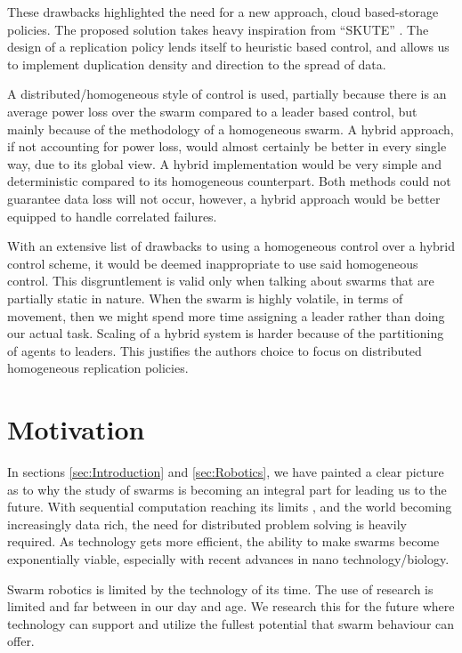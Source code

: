 \documentclass{UoYCSproject}
\begin{document}
These drawbacks highlighted the need for a new approach, cloud based-storage policies. The proposed solution takes heavy inspiration from “SKUTE” \cite{Distributed Storage}. The design of a replication policy lends itself to heuristic based control, and allows us to implement duplication density and direction to the spread of data.

A distributed/homogeneous style of control is used, partially because there is an average power loss over the swarm compared to a leader based control, but mainly because of the methodology of a homogeneous swarm. A hybrid approach, if not accounting for power loss, would almost certainly be better in every single way, due to its global view. A hybrid implementation would be very simple and deterministic compared to its homogeneous counterpart. Both methods could not guarantee data loss will not occur, however, a hybrid approach would be better equipped to handle correlated failures.

With an extensive list of drawbacks to using a homogeneous control over a hybrid control scheme, it would be deemed inappropriate to use said homogeneous control. This disgruntlement is valid only when talking about swarms that are partially static in nature. When the swarm is highly volatile, in terms of movement, then we might spend more time assigning a leader rather than doing our actual task. Scaling of a hybrid system is harder because of the partitioning of agents to leaders. This justifies the authors choice to focus on distributed homogeneous replication policies.

\section{Motivation}
\label{sec:Motivation}

In sections \ref{sec:Introduction} and \ref{sec:Robotics}, we have painted a clear picture as to why the study of swarms is becoming an integral part for leading us to the future.
With sequential computation reaching its limits \cite{CPU speed}, and the world becoming increasingly data rich, the need for distributed problem solving is heavily required.
As technology gets more efficient, the ability to make swarms become exponentially viable, especially with recent advances in nano technology/biology.

Swarm robotics is limited by the technology of its time.
The use of research is limited and far between in our day and age.
We research this for the future where technology can support and utilize the fullest potential that swarm behaviour can offer.
\end{document}
